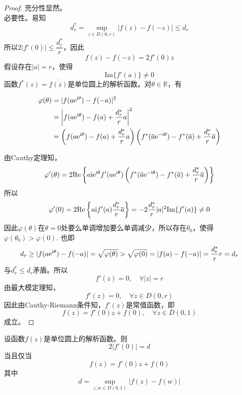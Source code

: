 \begin{proof}
    
    充分性显然。\\
    必要性。易知
    $$d_r^{*} = \sup\limits_{z \in D(0,r)}{|f(z) - f(-z)|} \leq d_r$$
    所以$2|f'(0)| \leq \dfrac{d_r^{*}}{r}$，因此
    $$f(z) - f(-z) = 2f'(0)z$$
    假设存在$|a| = r$，使得
    $$\mathrm{Im}\{f'(a)\} \neq 0$$
    函数$f^{*}(z) = \overline{f(\overline{z})}$是单位圆上的解析函数。对$\theta \in \mathbb{R}$，有

    \begin{align*}
        \varphi(\theta) & = |f(a\mathrm{e}^{\mathrm{i} \theta}) - f(-a)|^2 \\
        & = \left|f(a\mathrm{e}^{\mathrm{i} \theta}) - f(a) + \dfrac{d_r^{*}}{r}a\right|^2 \\
        & = \left(f(a\mathrm{e}^{\mathrm{i} \theta}) - f(a) + \dfrac{d_r^{*}}{r}a\right) \left(f^{*}(\overline{a}\mathrm{e}^{-\mathrm{i} \theta}) - f^{*}(\overline{a}) + \dfrac{d_r^{*}}{r}\overline{a}\right)
    \end{align*}

    由\textup{Cauthy}定理知，
    $$\varphi'(\theta) = 2 \mathrm{Re}\left\{ a\mathrm{i} \mathrm{e}^{\mathrm{i} \theta}f'(a\mathrm{e}^{\mathrm{i} \theta}) \left( f^{*}(\overline{a}\mathrm{e}^{-\mathrm{i} \theta}) - f^{*}(\overline{a}) + \dfrac{d_r^{*}}{r}\overline{a} \right) \right\}$$
    所以
    $$\varphi'(0) = 2 \mathrm{Re}\left\{a\mathrm{i} f'(a)\dfrac{d_r^{*}}{r}\overline{a}\right\} = -2\dfrac{d_r^{*}}{r}|a|^2\mathrm{Im}\{f'(a)\} \neq 0$$
    因此$\varphi(\theta)$在$\theta = 0$处要么单调增加要么单调减少，所以存在$\theta_0$，使得$\varphi(\theta_0) > \varphi(0)$. 也即
    $$d_r \geq |f(a\mathrm{e}^{\mathrm{i} \theta}) - f(-a)| = \sqrt{\varphi(\theta)} > \sqrt{\varphi(0)} = |f(a) - f(-a)| = \dfrac{d_r^{*}}{r}r = d_r$$
    与$d_r^{*} \leq d_r$矛盾。所以
    $$f'(z) = 0, \quad \forall |z| = r$$
    由最大模定理知，
    $$f'(z) = 0, \quad \forall z \in D(0,r)$$
    因此由\textup{Cauthy-Riemann}条件知，$f'(z)$是常值函数，即
    $$f(z) = f'(0)z + f(0), \quad \forall z \in D(0,1)$$
    成立。
    
\end{proof}

\begin{theorem}

    设函数$f(z)$是单位圆上的解析函数。则
    $$2|f'(0)| = d$$
    当且仅当
    $$f(z) = f'(0)z + f(0)$$
    其中
    $$d = \sup\limits_{z,w\in D(0,1)}{|f(z) - f(w)|}$$
    
\end{theorem}

